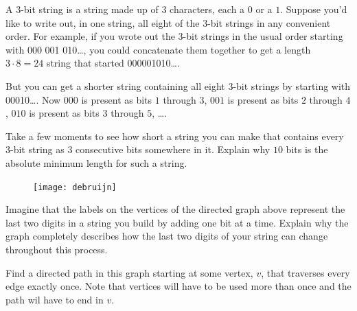 \documentclass[12pt,twoside]{article}
\begin{document}
\begin{problem}{15}

  A $3$-bit string is a string made up of $3$ characters, each a $0$
  or a $1$.  Suppose you'd like to write out, in one string, all eight
  of the 3-bit strings in any convenient order.  For example, if you
  wrote out the $3$-bit strings in the usual order starting with
  000 001 010\dots, you could concatenate them together to get a
  length $3\cdot 8 = 24$ string that started 000001010\dots.

  But you can get a shorter string containing all eight $3$-bit
  strings by starting with 00010\dots.  Now $000$ is present as bits
  $1$ through $3$, $001$ is present as bits $2$ through $4$, $010$ is
  present as bits $3$ through $5$, \dots.

\bparts

 Take a few moments to see how short a string you can make that
contains every $3$-bit string as $3$ consecutive bits somewhere in it.
Explain why $10$ bits is the absolute minimum length for such a
string.


\begin{figure} [htbp]
\centerline{\texttt{[image: debruijn]}}
\end{figure}

 Imagine that the labels on the vertices of the directed graph above
represent the last two digits in a string you build by adding one bit
at a time.  Explain why the graph completely describes how
the last two digits of your string can change throughout this process.


 Find a directed path in this graph starting at some vertex, $v$,
that traverses every edge exactly once.  Note that vertices will have to
be used more than once and the path wil have to end in $v$.


\end{problem}
\end{document}
